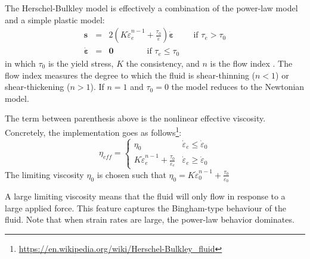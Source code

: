 The Herschel-Bulkley model is effectively a combination of the power-law model and 
a simple plastic model:
\begin{eqnarray}
{\bm s} &=& 2 \left(  K \dot{\varepsilon}_e^{n-1} + \frac{\tau_0}{\dot{\varepsilon}}\right)\dot{\bm \varepsilon} \qquad \text{ if } {\tau}_{e}>\tau_0 \\
\dot{\bm \varepsilon} &=& {\bm 0} \qquad\qquad \text{if }{\tau}_{e} \leq \tau_0 
\end{eqnarray}
in which $\tau_0$ is the yield stress, $K$ the consistency, and $n$ is the flow index  \cite{demj04}.
The flow index measures the degree to which the fluid is shear-thinning ($n<1$) or shear-thickening ($n>1$).
If $n=1$ and $\tau_0=0$ the model reduces to the Newtonian model. 

The term between parenthesis above is the nonlinear effective viscosity. Concretely, the implementation goes as 
follows\footnote{\url{https://en.wikipedia.org/wiki/Herschel-Bulkley_fluid}}:
\[
\eta_{eff} = 
\left\{
\begin{array}{cc}
\eta_0 & \dot{\varepsilon}_e\leq \dot{\varepsilon}_0 \\ 
K \dot{\varepsilon}_e^{n-1} + \frac{\tau_0}{\dot{\varepsilon}_e} & \dot{\varepsilon}_e \geq \dot{\varepsilon}_0
\end{array}
\right.
\]
The limiting viscosity $\eta_0$ is chosen such that 
$\eta_0 =  K \dot{\varepsilon}_0^{n-1} + \frac{\tau_0}{\dot{\varepsilon}_0}$

A large limiting viscosity means that the fluid will only flow in response to a large applied force. 
This feature captures the Bingham-type behaviour of the fluid. 
Note that when strain rates are large, the power-law behavior dominates. 


